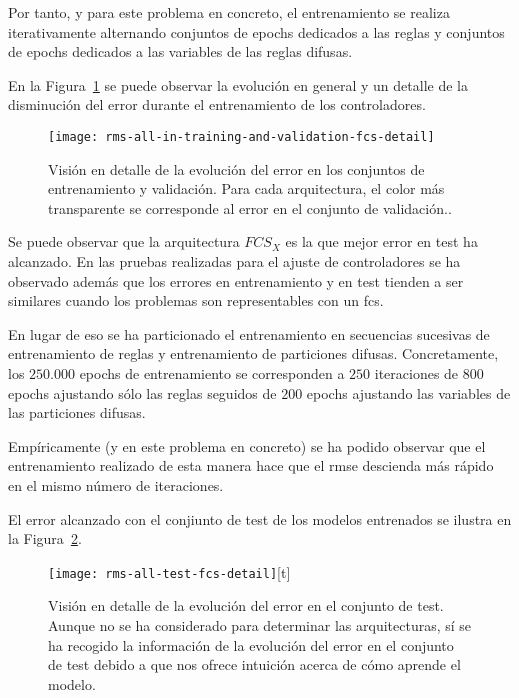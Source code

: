 Por tanto, y para este problema en concreto, el entrenamiento se realiza iterativamente alternando conjuntos de epochs dedicados a las reglas y conjuntos de epochs dedicados a las variables de las reglas difusas.

En la Figura~\ref{fig:rms-all-in-training-and-validation-fcs-detail} se puede observar la evolución en general y un detalle de la disminución del error durante el entrenamiento de los controladores.

\begin{figure}[!b]
	\centering
	\texttt{[image: rms-all-in-training-and-validation-fcs-detail]}
	\caption[Evolución del error en entrenamiento en los \ac{mlp} para las arquitecturas seleccionadas]{Visión en detalle de la evolución del error en los conjuntos de entrenamiento y validación. Para cada arquitectura, el color más transparente se corresponde al error en el conjunto de validación..}
	\label{fig:rms-all-in-training-and-validation-fcs-detail}
\end{figure}

Se puede observar que la arquitectura $FCS_X$ es la que mejor error en test ha alcanzado. En las pruebas realizadas para el ajuste de controladores se ha observado además que los errores en entrenamiento y en test tienden a ser similares cuando los problemas son representables con un \ac{fcs}.

En lugar de eso se ha particionado el entrenamiento en secuencias sucesivas de entrenamiento de reglas y entrenamiento de particiones difusas. Concretamente, los $250.000$ epochs de entrenamiento se corresponden a $250$ iteraciones de $800$ epochs ajustando sólo las reglas seguidos de $200$ epochs ajustando las variables de las particiones difusas.

Empíricamente (y en este problema en concreto) se ha podido observar que el entrenamiento realizado de esta manera hace que el \ac{rmse} descienda más rápido en el mismo número de iteraciones.

El error alcanzado con el conjiunto de test de los modelos entrenados se ilustra en la Figura~\ref{fig:rms-all-test-fcs-detail}.

\begin{figure}
	\centering
	\texttt{[image: rms-all-test-fcs-detail]}[t]
	\caption[Evolución del error en el conjunto de test durante el entrenamiento]{Visión en detalle de la evolución del error en el conjunto de test. Aunque no se ha considerado para determinar las arquitecturas, sí se ha recogido la información de la evolución del error en el conjunto de test debido a que nos ofrece intuición acerca de cómo aprende el modelo.}
	\label{fig:rms-all-test-fcs-detail}
\end{figure}

